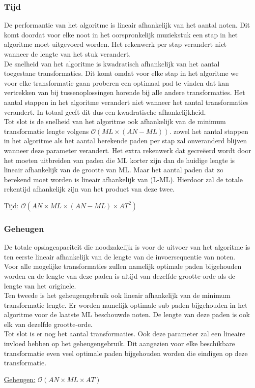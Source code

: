 \subsubsection{Tijd}
De performantie van het algoritme is lineair afhankelijk van het aantal noten. Dit komt doordat voor elke noot in het oorspronkelijk muziekstuk een stap in het algoritme moet uitgevoerd worden. Het rekenwerk per stap verandert niet wanneer de lengte van het stuk verandert.\\ 
De snelheid van het algoritme is kwadratisch afhankelijk van het aantal toegestane transformaties. Dit komt omdat voor elke stap in het algoritme we voor elke transformatie gaan proberen een optimaal pad te vinden dat kan vertrekken van bij tussenoplossingen horende bij alle andere transformaties. Het aantal stappen in het algoritme verandert niet wanneer het aantal transformaties verandert. In totaal geeft dit dus een kwadratische afhankelijkheid.\\ 
Tot slot is de snelheid van het algoritme ook afhankelijk van de minimum transformatie lengte volgens $\mathcal{O}(ML \times (AN-ML))$. zowel het aantal stappen in het algoritme als het aantal berekende paden per stap zal onveranderd blijven wanneer deze parameter verandert. Het extra rekenwerk dat gecre\"eerd wordt door het moeten uitbreiden van paden die ML korter zijn dan de huidige lengte is lineair afhankelijk van de grootte van ML. Maar het aantal paden dat zo berekend moet worden is lineair afhankelijk van (L-ML). Hierdoor zal de totale rekentijd afhankelijk zijn van het product van deze twee.

\begin{center}
\underline{Tijd:} $\mathcal{O}(AN \times ML \times (AN-ML) \times AT^2)$
\end{center}

\subsubsection{Geheugen}
De totale opslagcapaciteit die noodzakelijk is voor de uitvoer van het algoritme is ten eerste lineair afhankelijk van de lengte van de invoersequentie van noten. Voor alle mogelijke transformaties zullen namelijk optimale paden bijgehouden worden en de lengte van deze paden is altijd van dezelfde grootte-orde als de lengte van het originele.\\ 
Ten tweede is het geheugengebruik ook lineair afhankelijk van de minimum transformatie lengte. Er worden namelijk optimale sub paden bijgehouden in het algoritme voor de laatste ML beschouwde noten. De lengte van deze paden is ook elk van dezelfde grootte-orde.\\ 
Tot slot is er nog het aantal transformaties. Ook deze parameter zal een lineaire invloed hebben op het geheugengebruik. Dit aangezien voor elke beschikbare transformatie even veel optimale paden bijgehouden worden die eindigen op deze transformatie.  

\begin{center}
\underline{Geheugen:} $\mathcal{O}(AN \times ML \times AT)$
\end{center}

